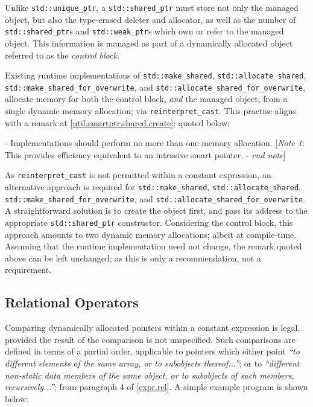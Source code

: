 \documentclass[10pt]{article}
\newcommand*{\wgxxi}[1]{[\href{https://wg21.link/#1}{#1}]}
\begin{document}
Unlike \texttt{std::unique\_ptr}, a \texttt{std::shared\_ptr} must store not
only the managed object, but also the type-erased deleter and allocator, as
well as the number of \texttt{std::shared\_ptr}s and \texttt{std::weak\_ptr}s
which own or refer to the managed object. This information is managed as part
of a dynamically allocated object referred to as the \emph{control block}.

Existing runtime implementations of \texttt{std::make\_shared},
\texttt{std::allocate\_shared}, \linebreak
\texttt{std::make\_shared\_for\_overwrite}, and
\texttt{std::allocate\_shared\_for\_overwrite}, allocate memory for both the
control block, \emph{and} the managed object, from a single dynamic memory
allocation; via \texttt{reinterpret\_cast}.  This practise aligns with a remark
at \wgxxi{util.smartptr.shared.create}; quoted below:

 - Implementations should perform no more than one memory allocation.\newline
\makebox[0pt][r]{\quad} \phantom{-} [\emph{Note 1}: This provides efficiency equivalent to an intrusive smart pointer.  - \emph{end note}]

As \texttt{reinterpret\_cast} is not permitted within a constant expression, an
alternative approach is required for \texttt{std::make\_shared},
\texttt{std::allocate\_shared}, \texttt{std::make\_shared\_for\_overwrite},
and \linebreak \texttt{std::allocate\_shared\_for\_overwrite}.  A
straightforward solution is to create the object first, and pass its address to
the appropriate \texttt{std::shared\_ptr} constructor. Considering the control
block, this approach amounts to two dynamic memory allocations; albeit at
compile-time. Assuming that the runtime implementation need not change, the
remark quoted above can be left unchanged; as this is only a recommendation,
not a requirement.

\subsection{Relational Operators}

Comparing dynamically allocated pointers within a constant expression is legal,
provided the result of the comparison is not unspecified.  Such comparisons are
defined in terms of a partial order, applicable to pointers which either point
\emph{``to different elements of the same array, or to subobjects
thereof...''}; or to \emph{``different non-static data members of the same
object, or to subobjects of such members, recursively...''}; from paragraph 4
of \wgxxi{expr.rel}. A simple example program is shown below:
\end{document}
